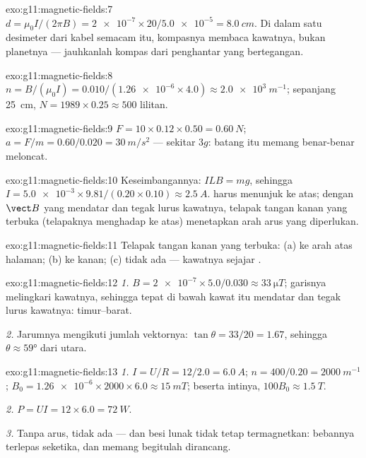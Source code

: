 \begin{solution}{exo:g11:magnetic-fields:7}
$d = \mu_0 I / (2\pi B) = \num{2e-7} \times 20 / \num{5.0e-5}
= \qty{8.0}{cm}$. Di dalam satu desimeter dari kabel semacam itu,
kompasnya membaca kawatnya, bukan planetnya --- jauhkanlah kompas dari
penghantar yang bertegangan.
\end{solution}

\begin{solution}{exo:g11:magnetic-fields:8}
$n = B/(\mu_0 I) = 0.010 / (\num{1.26e-6} \times 4.0)
\approx \qty{2.0e3}{m^{-1}}$; sepanjang \qty{25}{cm},
$N = 1989 \times 0.25 \approx 500$ lilitan.
\end{solution}

\begin{solution}{exo:g11:magnetic-fields:9}
$F = 10 \times 0.12 \times 0.50 = \qty{0.60}{N}$;
$a = F/m = 0.60/0.020 = \qty{30}{m/s^2}$ --- sekitar $3g$: batang itu
memang benar-benar meloncat.
\end{solution}

\begin{solution}{exo:g11:magnetic-fields:10}
Keseimbangannya: $ILB = mg$, sehingga
$I = \num{5.0e-3} \times 9.81 / (0.20 \times 0.10) \approx
\qty{2.5}{A}$.  harus menunjuk ke atas; dengan $\vect B$ yang
mendatar dan tegak lurus kawatnya, telapak tangan kanan yang terbuka
(telapaknya menghadap ke atas) menetapkan arah arus yang diperlukan.
\end{solution}

\begin{solution}{exo:g11:magnetic-fields:11}
Telapak tangan kanan yang terbuka: (a) ke arah atas halaman; (b) ke
kanan; (c) tidak ada  --- kawatnya sejajar .
\end{solution}

\begin{solution}{exo:g11:magnetic-fields:12}
\emph{1.} $B = \num{2e-7} \times 5.0 / 0.030 \approx
\qty{33}{\micro T}$; garisnya melingkari kawatnya, sehingga tepat di
bawah kawat itu  mendatar dan tegak lurus kawatnya:
timur--barat.

\emph{2.} Jarumnya mengikuti jumlah vektornya: $\tan\theta = 33/20 =
1.67$, sehingga $\theta \approx \ang{59}$ dari utara.
\end{solution}

\begin{solution}{exo:g11:magnetic-fields:13}
\emph{1.} $I = U/R = 12/2.0 = \qty{6.0}{A}$;
$n = 400/0.20 = \qty{2000}{m^{-1}}$;
$B_0 = \num{1.26e-6} \times 2000 \times 6.0 \approx \qty{15}{mT}$;
beserta intinya, $100 B_0 \approx \qty{1.5}{T}$.

\emph{2.} $P = UI = 12 \times 6.0 = \qty{72}{W}$.

\emph{3.} Tanpa arus, tidak ada  --- dan besi lunak tidak tetap
termagnetkan: bebannya terlepas seketika, dan memang begitulah
dirancang.
\end{solution}

